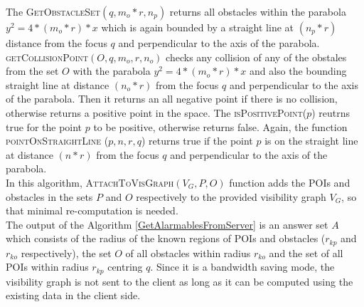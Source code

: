 The \textsc{GetObstacleSet}$(q, m_o * r, n_p)$ returns all obstacles within the parabola $y^2 = 4*(m_o*r)*x$ which is again bounded by a straight line at $(n_p*r)$ distance from the focus $q$ and perpendicular to the axis of the parabola.\\

\textsc{getCollisionPoint}$(O, q, m_o, r, n_o)$ checks any collision of any of the obstales from the set $O$ with the parabola $y^2 = 4 * (m_o * r) * x$ and also the bounding straight line at distance $(n_o*r)$ from the focus $q$ and perpendicular to the axis of the parabola. Then it returns an all negative point if there is no collision, otherwise returns a positive point in the space. The \textsc{isPositivePoint}($p$) reutrns true for the point $p$ to be positive, otherwise returns false. Again, the function \textsc{pointOnStraightLine} ($p, n, r, q$) returns true if the point $p$ is on the straight line at distance $(n*r)$ from the focus $q$ and perpendicular to the axis of the parabola.\\

In this algorithm, \textsc{AttachToVisGraph}$(V_G, P, O)$ function adds the POIs and obstacles in the sets $P$ and $O$ respectively to the provided visibility graph $V_G$, so that minimal re-computation is needed.\\

The output of the Algorithm \ref{GetAlarmablesFromServer} is an answer set $A$ which consists of the radius of the known regions of POIs and obstacles ($r_{kp}$ and $r_{ko}$ respectively), the set $O$ of all obstacles within radius $r_{ko}$ and the set of all POIs within radius $r_{kp}$ centring $q$. Since it is a bandwidth saving mode, the visibility graph is not sent to the client as long as it can be computed using the existing data in the client side.\\

